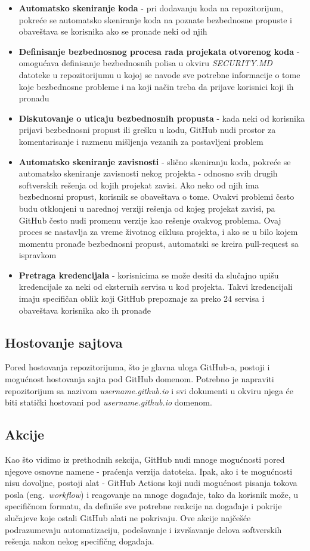 \documentclass[12pt]{report}
\begin{document}
\begin{itemize}
    \item \textbf{Automatsko skeniranje koda} - pri dodavanju koda na repozitorijum, pokreće se automatsko skeniranje koda na poznate bezbednosne propuste i obaveštava se korisnika ako se pronađe neki od njih
    \item \textbf{Definisanje bezbednosnog procesa rada projekata otvorenog koda} - omogućava definisanje bezbednosnih polisa u okviru \textit{SECURITY.MD} datoteke u repozitorijumu u kojoj se navode sve potrebne informacije o tome koje bezbednosne probleme i na koji način treba da prijave korisnici koji ih pronađu
    \item \textbf{Diskutovanje o uticaju bezbednosnih propusta} - kada neki od korisnika prijavi bezbednosni propust ili grešku u kodu, GitHub nudi prostor za komentarisanje i razmenu mišljenja vezanih za postavljeni problem
    \item \textbf{Automatsko skeniranje zavisnosti} - slično skeniranju koda, pokreće se automatsko skeniranje zavisnosti nekog projekta - odnosno svih drugih softverskih rešenja od kojih projekat zavisi. Ako neko od njih ima bezbednosni propust, korisnik se obaveštava o tome. Ovakvi problemi često budu otklonjeni u narednoj verziji rešenja od kojeg projekat zavisi, pa GitHub često nudi promenu verzije kao rešenje ovakvog problema. Ovaj proces se nastavlja za vreme životnog ciklusa projekta, i ako se u bilo kojem momentu pronađe bezbednosni propust, automatski se kreira pull-request sa ispravkom
    \item \textbf{Pretraga kredencijala} - korisnicima se može desiti da slučajno upišu kredencijale za neki od eksternih servisa u kod projekta. Takvi kredencijali imaju specifičan oblik koji GitHub prepoznaje za preko 24 servisa i obaveštava korisnika ako ih pronađe
\end{itemize}

\subsection{Hostovanje sajtova}
Pored hostovanja repozitorijuma, što je glavna uloga GitHub-a, postoji i mogućnost hostovanja sajta pod GitHub domenom. Potrebno je napraviti repozitorijum sa nazivom \textit{username.github.io} i svi dokumenti u okviru njega će biti statički hostovani pod \textit{username.github.io} domenom.

\subsection{Akcije}
Kao što vidimo iz prethodnih sekcija, GitHub nudi mnoge mogućnosti pored njegove osnovne namene - praćenja verzija datoteka. Ipak, ako i te mogućnosti nisu dovoljne, postoji alat - GitHub Actions koji nudi mogućnost pisanja tokova posla (eng.\ \textit{workflow}) i reagovanje na mnoge događaje, tako da korisnik može, u specifičnom formatu, da definiše sve potrebne reakcije na događaje i pokrije slučajeve koje ostali GitHub alati ne pokrivaju. Ove akcije najčešće podrazumevaju automatizaciju, podešavanje i izvršavanje delova softverskih rešenja nakon nekog specifičng događaja.
\end{document}

